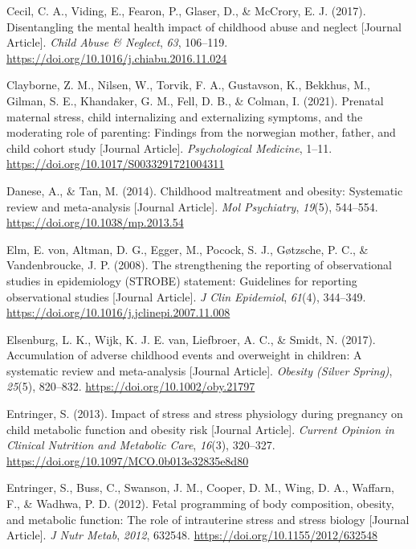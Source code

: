 \documentclass[
  letterpaper,
  DIV=11,
  numbers=noendperiod]{scrreport}
\newlength{\cslhangindent}
\newenvironment{CSLReferences}[2] %
 {\begin{list}{}{%
  \setlength{\itemindent}{0pt}
  \setlength{\leftmargin}{0pt}
  \setlength{\parsep}{0pt}
  \ifodd #1
   \setlength{\leftmargin}{\cslhangindent}
   \setlength{\itemindent}{-1\cslhangindent}
  \fi
  \setlength{\itemsep}{#2\baselineskip}}}
 {\end{list}}
\begin{document}
\begin{CSLReferences}{1}{0}
Cecil, C. A., Viding, E., Fearon, P., Glaser, D., \& McCrory, E. J.
(2017). Disentangling the mental health impact of childhood abuse and
neglect {[}Journal Article{]}. \emph{Child Abuse \& Neglect}, \emph{63},
106--119. \url{https://doi.org/10.1016/j.chiabu.2016.11.024}

Clayborne, Z. M., Nilsen, W., Torvik, F. A., Gustavson, K., Bekkhus, M.,
Gilman, S. E., Khandaker, G. M., Fell, D. B., \& Colman, I. (2021).
Prenatal maternal stress, child internalizing and externalizing
symptoms, and the moderating role of parenting: Findings from the
norwegian mother, father, and child cohort study {[}Journal Article{]}.
\emph{Psychological Medicine}, 1--11.
\url{https://doi.org/10.1017/S0033291721004311}

Danese, A., \& Tan, M. (2014). Childhood maltreatment and obesity:
Systematic review and meta-analysis {[}Journal Article{]}. \emph{Mol
Psychiatry}, \emph{19}(5), 544--554.
\url{https://doi.org/10.1038/mp.2013.54}

Elm, E. von, Altman, D. G., Egger, M., Pocock, S. J., Gøtzsche, P. C.,
\& Vandenbroucke, J. P. (2008). The strengthening the reporting of
observational studies in epidemiology (STROBE) statement: Guidelines for
reporting observational studies {[}Journal Article{]}. \emph{J Clin
Epidemiol}, \emph{61}(4), 344--349.
\url{https://doi.org/10.1016/j.jclinepi.2007.11.008}

Elsenburg, L. K., Wijk, K. J. E. van, Liefbroer, A. C., \& Smidt, N.
(2017). Accumulation of adverse childhood events and overweight in
children: A systematic review and meta-analysis {[}Journal Article{]}.
\emph{Obesity (Silver Spring)}, \emph{25}(5), 820--832.
\url{https://doi.org/10.1002/oby.21797}

Entringer, S. (2013). Impact of stress and stress physiology during
pregnancy on child metabolic function and obesity risk {[}Journal
Article{]}. \emph{Current Opinion in Clinical Nutrition and Metabolic
Care}, \emph{16}(3), 320--327.
\url{https://doi.org/10.1097/MCO.0b013e32835e8d80}

Entringer, S., Buss, C., Swanson, J. M., Cooper, D. M., Wing, D. A.,
Waffarn, F., \& Wadhwa, P. D. (2012). Fetal programming of body
composition, obesity, and metabolic function: The role of intrauterine
stress and stress biology {[}Journal Article{]}. \emph{J Nutr Metab},
\emph{2012}, 632548. \url{https://doi.org/10.1155/2012/632548}


\end{CSLReferences}
\end{document}
